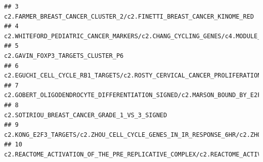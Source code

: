 \documentclass{article}\usepackage[]{graphicx}\usepackage[]{color}
\makeatletter
\newenvironment{kframe}{%
 \def\at@end@of@kframe{}%
 \ifinner\ifhmode%
  \def\at@end@of@kframe{\end{minipage}}%
  \begin{minipage}{\columnwidth}%
 \fi\fi%
 \def\FrameCommand##1{\hskip\@totalleftmargin \hskip-\fboxsep
 \colorbox{shadecolor}{##1}\hskip-\fboxsep
     \hskip-\linewidth \hskip-\@totalleftmargin \hskip\columnwidth}%
 \MakeFramed {\advance\hsize-\width
   \@totalleftmargin\z@ \linewidth\hsize
   \@setminipage}}%
 {\par\unskip\endMakeFramed%
 \at@end@of@kframe}
\newenvironment{knitrout}{}{} %
\makeatother
\begin{document}
\begin{knitrout}
\begin{kframe}
\begin{verbatim}
## 3                                                                                                                                                                                                                                                                                   c2.FARMER_BREAST_CANCER_CLUSTER_2/c2.FINETTI_BREAST_CANCER_KINOME_RED
## 4                                                                                                                                                                                                                                                                  c2.WHITEFORD_PEDIATRIC_CANCER_MARKERS/c2.CHANG_CYCLING_GENES/c4.MODULE_54/c4.MODULE_57
## 5                                                                                                                                                                                                                                                                                                                       c2.GAVIN_FOXP3_TARGETS_CLUSTER_P6
## 6                                                                                                                                                                                         c2.EGUCHI_CELL_CYCLE_RB1_TARGETS/c2.ROSTY_CERVICAL_CANCER_PROLIFERATION_CLUSTER/c4.GNF2_BUB1/c4.GNF2_ESPL1/c4.GNF2_PCNA/c4.GNF2_RRM2/c4.GNF2_BUB1B/c4.GNF2_MCM4
## 7                                                                                                                                                                                                                                                                   c2.GOBERT_OLIGODENDROCYTE_DIFFERENTIATION_SIGNED/c2.MARSON_BOUND_BY_E2F4_UNSTIMULATED
## 8                                                                                                                                                                                                                                                                                                           c2.SOTIRIOU_BREAST_CANCER_GRADE_1_VS_3_SIGNED
## 9                                                                                                                                                                                                                                           c2.KONG_E2F3_TARGETS/c2.ZHOU_CELL_CYCLE_GENES_IN_IR_RESPONSE_6HR/c2.ZHOU_CELL_CYCLE_GENES_IN_IR_RESPONSE_24HR
## 10                                                                                                                                                                                                     c2.REACTOME_ACTIVATION_OF_THE_PRE_REPLICATIVE_COMPLEX/c2.REACTOME_ACTIVATION_OF_ATR_IN_RESPONSE_TO_REPLICATION_STRESS/c2.REACTOME_G2_M_CHECKPOINTS

\end{verbatim}
\end{kframe}
\end{knitrout}
\end{document}
